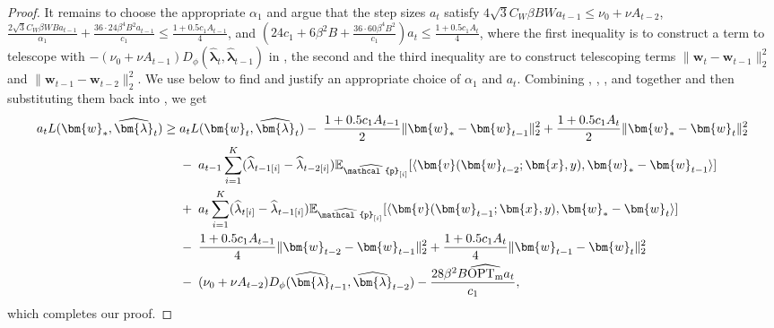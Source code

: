 \documentclass[11pt]{article}
\numberwithin{thm}{section}
\theoremstyle{plain}
\theoremstyle{definition}
\theoremstyle{remark} \newtheorem{remark}[thm]{Remark}
\def\vlambda{{\bm{\lambda}}}
\def\vv{{\bm{v}}}
\def\vw{{\bm{w}}}
\def\vx{{\bm{x}}}
\def\ep{\widehat{\mathcal{p}}}
\newcommand{\E}{\mathbb{E}}
\newcommand{\innp}[1]{\langle #1 \rangle}
\newcommand{\epi}{\ep_{[i]}}
\newcommand{\elambda}{\widehat{\lambda}}
\newcommand{\evlambda}{\widehat{\vlambda}}
\DeclareMathOperator{\mOPT}{OPT_m}
\newcommand{\mOPThat}{\widehat{\mOPT}}
\begin{document}
\begin{proof}
    It remains to choose the appropriate \(\alpha_1\) and argue that the step sizes \(a_t\) satisfy \(4\sqrt{3}C_W\beta BWa_{t-1}\leq \nu_0+\nu A_{t-2}\), \(\frac{2\sqrt{3}C_W\beta WBa_{t-1}}{\alpha_1}+\frac{36\cdot24\beta^4B^2a_{t-1}}{c_1}\leq \frac{1+0.5c_1A_{t-1}}{4}\), and \((24c_1+6\beta^2B+\frac{36\cdot 60\beta^4B^2}{c_1})a_t\leq \frac{1+0.5c_1A_t}{4}\),  where the first inequality is to construct a term to telescope with \(-(\nu_0+\nu A_{t-1})D_{\phi}(\evlambda_t,\evlambda_{t-1})\) in , the second and the third inequality are to construct telescoping terms \(\|\vw_t-\vw_{t-1}\|_2^2\) and \(\|\vw_{t-1}-\vw_{t-2}\|_2^2\).
    We use  below to find and justify an appropriate choice of \(\alpha_1\) and \(a_t\). Combining , , ,  and  together and then substituting them back into , we get
	\begin{align*}
		a_tL(\vw_*,\evlambda_t)\ge \; & a_tL(\vw_t,\evlambda_t) - \; \frac{1+0.5c_1A_{t-1}}{2}\|\vw_*-\vw_{t-1}\|_2^2 + \frac{1+0.5c_1A_t}{2}\|\vw_*-\vw_t\|_2^2 \notag \\
		&- \; a_{t-1}\sum_{i=1}^K(\elambda_{t-1[i]}-\elambda_{t-2[i]})\E_{\epi}[\innp{\vv(\vw_{t-2};\vx,y), \vw_*-\vw_{t-1}}] \notag \\
        &+ \; a_t\sum_{i=1}^K(\elambda_{t[i]}-\elambda_{t-1[i]})\E_{\epi}[\innp{\vv(\vw_{t-1};\vx,y), \vw_*-\vw_t}] \notag \\
        &- \; \frac{1+0.5c_1A_{t-1}}{4}\|\vw_{t-2}-\vw_{t-1}\|_2^2+\frac{1+0.5c_1A_t}{4}\|\vw_{t-1}-\vw_t\|_2^2 \notag \\
        &- \; (\nu_0+\nu A_{t-2})D_{\phi}(\evlambda_{t-1}, \evlambda_{t-2})-\frac{28\beta^2B\mOPThat a_t}{c_1},
	\end{align*}
	which completes our proof. 
\end{proof}

\lemubaux*
\end{document}
